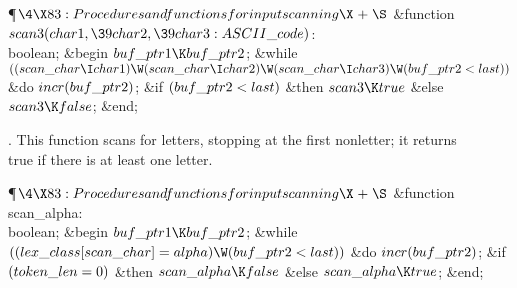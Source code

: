 \Y\P$\4\X83:Procedures and functions for input scanning\X\mathrel{+}\S$\6
\4\&{function}\1\  $\\{scan3}(\\{char1},\39\\{char2},\39\\{char3}:\\{ASCII%
\_code})$: \\{boolean};\2\6
\&{begin} $\\{buf\_ptr1}\K\\{buf\_ptr2}$;\6
\&{while} $((\\{scan\_char}\I\\{char1})\W(\\{scan\_char}\I\\{char2})\W(\\{scan%
\_char}\I\\{char3})\W(\\{buf\_ptr2}<\\{last}))$ \1\&{do}\5
$\\{incr}(\\{buf\_ptr2})$;\2\6
\&{if} $(\\{buf\_ptr2}<\\{last})$ \1\&{then}\5
$\\{scan3}\K\\{true}$\6
\4\&{else} $\\{scan3}\K\\{false}$;\2\6
\&{end};\par
\fi

.
This function scans for letters, stopping at the first nonletter; it
returns \\{true} if there is at least one letter.

\Y\P$\4\X83:Procedures and functions for input scanning\X\mathrel{+}\S$\6
\4\&{function}\1\  \\{scan\_alpha}: \\{boolean};\2\6
\&{begin} $\\{buf\_ptr1}\K\\{buf\_ptr2}$;\6
\&{while} $((\\{lex\_class}[\\{scan\_char}]=\\{alpha})\W(\\{buf\_ptr2}<%
\\{last}))$ \1\&{do}\5
$\\{incr}(\\{buf\_ptr2})$;\2\6
\&{if} $(\\{token\_len}=0)$ \1\&{then}\5
$\\{scan\_alpha}\K\\{false}$\6
\4\&{else} $\\{scan\_alpha}\K\\{true}$;\2\6
\&{end};\par
\fi

